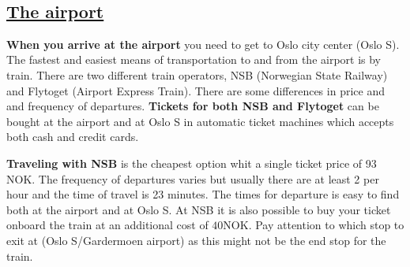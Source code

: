 \documentclass{article}
\begin{document}
\begin{center}
\begin{changemargin}{-1cm}{-1cm}
\end{changemargin}
\end{center}

\clearpage

\
\subsection*{\underline{The airport}}

\textbf{When you arrive at the airport} you need to
get to Oslo city center (Oslo S).
The fastest and easiest means of transportation to and from the airport
is by train. There are two different train operators, NSB
(Norwegian State Railway) and Flytoget (Airport Express Train).
There are some differences in price and
 and frequency of departures.
\textbf{Tickets for both NSB and Flytoget} can be bought at the airport
and at Oslo S in automatic ticket machines which accepts both cash
and credit cards.

\textbf{Traveling with NSB} is the cheapest
option whit a single ticket price
of 93 NOK. The frequency of departures varies but
usually there are at least 2 per hour and the time of travel is 23
 minutes. The times for departure is easy to find
both at the airport and at Oslo S.
At NSB it is also possible to buy your ticket
onboard the train at an additional cost of $40$NOK.
Pay attention to which stop to exit at (Oslo S/Gardermoen airport)
as this might not be the end stop for the train.
\end{document}
